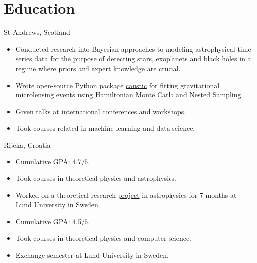 \documentclass[11pt,a4paper,roman, colorlinks,linkcolor=true]{moderncv}
\begin{document}
\section{Education}
{St Andrews, Scotland}{}{    \begin{itemize}
            \item Conducted research into Bayesian approaches to modeling astrophysical time-series data for the purpose of detecting stars, exoplanets and black holes in a regime where priors and expert knowledge are crucial.
            \item Wrote open-source Python package \href{https://caustic.readthedocs.io/en/latest/}{caustic} for fitting gravitational microlensing events using Hamiltonian Monte Carlo and Nested Sampling.
       \item Given talks at international conferences and workshops.
           \item Took courses related in machine learning and data science.
\end{itemize}}
{Rijeka, Croatia}{}{\begin{itemize}\item Cumulative GPA: 4.7/5. 
            \item Took courses in theoretical physics and astrophysics.
\item Worked on a theoretical research \href{https://github.com/fbartolic/master_thesis}{project} in astrophysics for 7 months at Lund University in Sweden.\end{itemize}}
{\begin{itemize}\item Cumulative GPA: 4.5/5.
            \item Took courses in theoretical physics and computer science.
            \item Exchange semester at Lund University in Sweden.
\end{itemize}}
\end{document}
